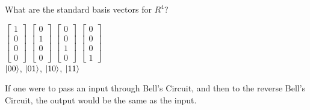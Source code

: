 \begin{question}
    What are the standard basis vectors for $R^4$?
\end{question}

\hfill

\begin{solution}
    $\begin{bmatrix}
        1\\
        0\\
        0\\
        0
    \end{bmatrix}$
    $\begin{bmatrix}
        0\\
        1\\
        0\\
        0
    \end{bmatrix}$
    $\begin{bmatrix}
        0\\
        0\\
        1\\
        0
    \end{bmatrix}$
    $\begin{bmatrix}
        0\\
        0\\
        0\\
        1
    \end{bmatrix}$\\
    $\lvert00\rangle$, $\lvert01\rangle$, $\lvert10\rangle$, $\lvert11\rangle$
\end{solution}

If one were to pass an input through Bell's Circuit, and then to the reverse Bell's Circuit, the output would be the same as the input.


